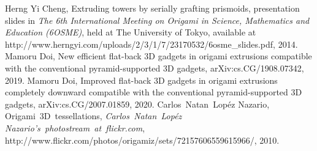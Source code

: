\documentclass[11pt]{amsart}
\numberwithin{equation}{section}
\numberwithin{theorem}{section}
\begin{document}
\begin{thebibliography}{9}
 Herng Yi Cheng, Extruding towers by serially grafting prismoids,
presentation slides in {\it The 6th International Meeting on Origami in Science, Mathematics and Education (6OSME)}, held at The University of Tokyo,
available at http://www.herngyi.com/uploads/2/3/1/7/23170532/6osme{\_}slides.pdf, 2014.
Mamoru Doi, New efficient flat-back 3D gadgets in origami extrusions compatible with the conventional pyramid-supported 3D gadgets,
arXiv:cs.CG/1908.07342, 2019.
Mamoru Doi, Improved flat-back 3D gadgets in origami extrusions completely downward compatible with the conventional pyramid-supported 3D gadgets,
arXiv:cs.CG/2007.01859, 2020.
 Carlos~Natan~Lop\'{e}z Nazario, Origami~3D~tessellations, {\it Carlos~Natan~Lop\'{e}z Nazario's~photostream~at~flickr.com},
http://www.flickr.com/photos/origamiz/sets/72157606559615966/, 2010.
\end{thebibliography}
\end{document}
